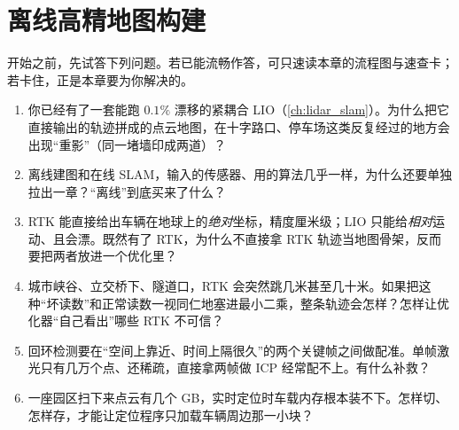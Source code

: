 \chapter{离线高精地图构建}
\label{ch:lidar-map}


\begin{practice}[前置自测]
开始之前，先试答下列问题。若已能流畅作答，可只速读本章的流程图与速查卡；若卡住，正是本章要为你解决的。
\begin{enumerate}
  \item 你已经有了一套能跑 $0.1\%$ 漂移的紧耦合 LIO（\cref{ch:lidar_slam}）。为什么把它直接输出的轨迹拼成的点云地图，在十字路口、停车场这类反复经过的地方会出现“重影”（同一堵墙印成两道）？
  \item 离线建图和在线 SLAM，输入的传感器、用的算法几乎一样，为什么还要单独拉出一章？“离线”到底买来了什么？
  \item RTK 能直接给出车辆在地球上的\emph{绝对}坐标，精度厘米级；LIO 只能给\emph{相对}运动、且会漂。既然有了 RTK，为什么不直接拿 RTK 轨迹当地图骨架，反而要把两者放进一个优化里？
  \item 城市峡谷、立交桥下、隧道口，RTK 会突然跳几米甚至几十米。如果把这种“坏读数”和正常读数一视同仁地塞进最小二乘，整条轨迹会怎样？怎样让优化器“自己看出”哪些 RTK 不可信？
  \item 回环检测要在“空间上靠近、时间上隔很久”的两个关键帧之间做配准。单帧激光只有几万个点、还稀疏，直接拿两帧做 ICP 经常配不上。有什么补救？
  \item 一座园区扫下来点云有几个 GB，实时定位时车载内存根本装不下。怎样切、怎样存，才能让定位程序只加载车辆周边那一小块？
\end{enumerate}
\end{practice}

